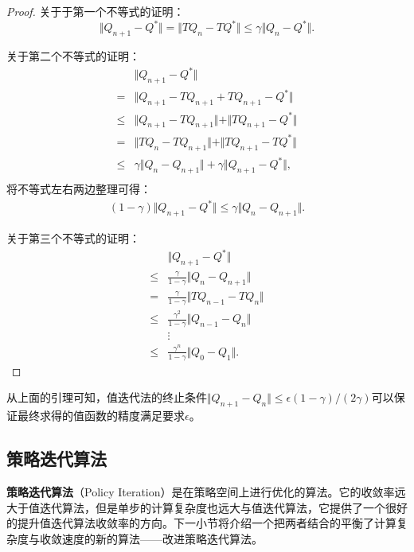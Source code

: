 \begin{proof}
    关于于第一个不等式的证明：
    \begin{equation*}
        \Vert Q_{n+1} - Q^* \Vert
        = \Vert TQ_{n} - TQ^* \Vert 
        \le \gamma \Vert Q_{n} - Q^* \Vert.
    \end{equation*}

    关于第二个不等式的证明：
    \begin{align*}
        &\Vert Q_{n+1} - Q^* \Vert \\
        =& \Vert Q_{n+1} - TQ_{n+1} + TQ_{n+1} - Q^* \Vert \\
        \le& \Vert Q_{n+1} - TQ_{n+1}\Vert + \Vert TQ_{n+1} - Q^* \Vert \\
        =& \Vert T Q_{n} - TQ_{n+1}\Vert + \Vert TQ_{n+1} - TQ^* \Vert \\
        \le& \gamma \Vert Q_{n} - Q_{n+1}\Vert 
            + \gamma\Vert Q_{n+1} - Q^* \Vert, \\
    \end{align*}
    将不等式左右两边整理可得：
    \begin{align*}
        (1 - \gamma)\Vert Q_{n+1} - Q^* \Vert \le
        \gamma \Vert Q_n - Q_{n+1} \Vert.
    \end{align*}
    
    关于第三个不等式的证明：
    \begin{align*}
        &\Vert Q_{n+1} - Q^* \Vert \\
        \le& \frac{\gamma}{1-\gamma} \Vert Q_n - Q_{n+1} \Vert\\
        =& \frac{\gamma}{1-\gamma} \Vert TQ_{n-1} - TQ_{n} \Vert\\
        \le& \frac{\gamma^2}{1-\gamma} \Vert Q_{n-1} - Q_{n} \Vert\\
        & \vdots\\
        \le& \frac{\gamma^n}{1-\gamma} \Vert Q_0 - Q_1 \Vert.
    \end{align*}
\end{proof}

从上面的引理可知，值迭代法的终止条件$\Vert Q_{n+1} - Q_{n} \Vert \le \epsilon(1-\gamma) /(2\gamma)$可以保证最终求得的值函数的精度满足要求$\epsilon$。

\subsection{策略迭代算法}

\textbf{策略迭代算法}（Policy Iteration）是在策略空间上进行优化的算法。它的收敛率远大于值迭代算法，但是单步的计算复杂度也远大与值迭代算法，它提供了一个很好的提升值迭代算法收敛率的方向。下一小节将介绍一个把两者结合的平衡了计算复杂度与收敛速度的新的算法——改进策略迭代算法。

